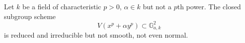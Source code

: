 \documentclass[../main.tex]{subfiles}
\begin{document}
\begin{example}
Let $k$ be a field of characteristic $p>0$, $\alpha\in k$ but not a $p$th power. The closed subgroup scheme 
$$V(x^{p}+\alpha y^{p})\subset \mathbb{G}_{a,k}^{2}$$
is reduced and irreducible but not smooth, not even normal.
\end{example}
\end{document}
